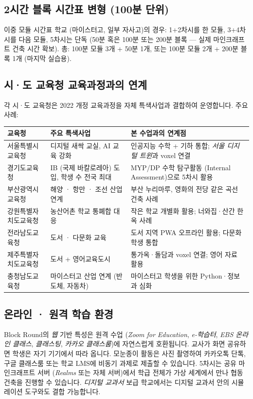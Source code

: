 \documentclass[12pt,a4paper]{scrartcl}
\begin{document}
\subsection{2시간 블록 시간표 변형 (100분 단위)}
이중 모듈 시간표 학교 (마이스터고, 일부 자사고)의 경우: 1+2차시를 한 모듈, 3+4차시를 다음 모듈, 5차시는 단독 (50분 혹은 100분 또는 200분 블록 — 실제 마인크래프트 건축 시간 확보). 총: 100분 모듈 3개 + 50분 1개, 또는 100분 모듈 2개 + 200분 블록 1개 (마지막 실습용).

\subsection{시·도 교육청 교육과정과의 연계}

각 시·도 교육청은 2022 개정 교육과정을 자체 특색사업과 결합하여 운영합니다. 주요 사례:

\begin{center}
\small
\begin{tabularx}{\textwidth}{@{}p{}p{}X@{}}
\toprule
\textbf{교육청} & \textbf{주요 특색사업} & \textbf{본 수업과의 연계점} \\
\midrule
서울특별시교육청 & 디지털 새싹 교실, AI 교육 강화 & 인공지능 수학 + 기하 통합; \emph{서울 디지털 트윈}과 voxel 연결 \\
\addlinespace[3pt]
경기도교육청 & IB (국제 바칼로레아) 도입, 학생 수 전국 최대 & MYP/DP 수학 탐구활동 (Internal Assessment)으로 5차시 활용 \\
\addlinespace[3pt]
부산광역시교육청 & 해양 · 항만 · 조선 산업 연계 & 부산 누리마루, 영화의 전당 같은 곡선 건축 사례 \\
\addlinespace[3pt]
강원특별자치도교육청 & 농산어촌 학교 통폐합 대응 & 작은 학교 개별화 활용; 너와집·산간 한옥 사례 \\
\addlinespace[3pt]
전라남도교육청 & 도서 · 다문화 교육 & 도서 지역 PWA 오프라인 활용; 다문화 학생 통합 \\
\addlinespace[3pt]
제주특별자치도교육청 & 도서 + 영어교육도시 & 통가옥·돌담과 voxel 연결; 영어 자료 활용 \\
\addlinespace[3pt]
충청남도교육청 & 마이스터고 산업 연계 (반도체, 자동차) & 마이스터고 학생을 위한 Python·정보과 심화 \\
\bottomrule
\end{tabularx}
\end{center}

\subsection{온라인 · 원격 학습 환경}
Block Round의 \emph{웹} 기반 특성은 원격 수업 (\emph{Zoom for Education}, \emph{e-학습터}, \emph{EBS 온라인 클래스}, \emph{클래스팅}, \emph{카카오 클래스룸})에 자연스럽게 호환됩니다. 교사가 화면 공유하면 학생은 자기 기기에서 따라 옵니다. 모눈종이 활동은 사진 촬영하여 카카오톡 단톡, 구글 클래스룸 또는 학교 LMS에 비동기 과제로 제출할 수 있습니다. 5차시는 공유 마인크래프트 서버 (\emph{Realms} 또는 자체 서버)에서 학급 전체가 가상 세계에서 만나 협동 건축을 진행할 수 있습니다. \emph{디지털 교과서} 보급 학교에서는 디지털 교과서 안의 시뮬레이션 도구와도 결합 가능합니다.
\end{document}
